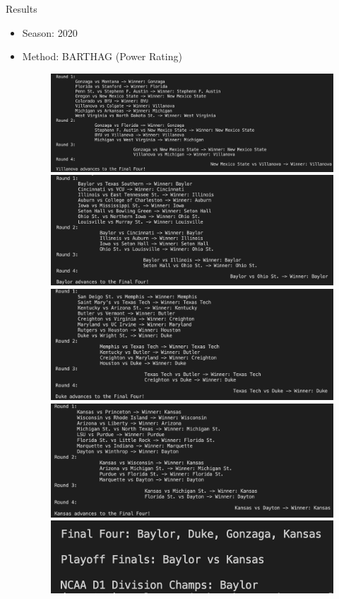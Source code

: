 \documentclass{beamer}
\begin{document}
\begin{frame}{Results}
\begin{itemize}
  \item Season: 2020 
  \item Method: BARTHAG (Power Rating)
  
      \begin{figure}
      \includegraphics[width=0.4\linewidth]{CBB2020_power_west16.png}
      \includegraphics[width=0.4\linewidth]{CBB2020_power_south16.png}
      \includegraphics[width=0.4\linewidth]{CBB2020_power_east16.png}
      \includegraphics[width=0.4\linewidth]{CBB2020_power_midwest16.png}
      \includegraphics[width=0.6\linewidth]{CBB2020_power_final.png}
    \end{figure}
    
\end{itemize}
\end{frame}
\end{document}
